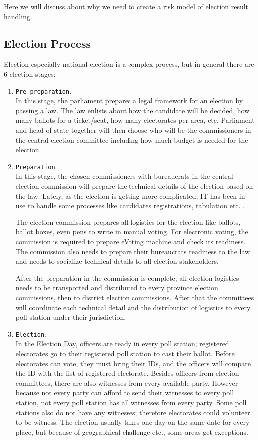 \documentclass[JIP]{ipsj}
\def\|{\verb|}
\begin{document}
Here we will discuss about why we need to create a risk model of election result handling.

\subsection{Election Process}%2.1
\label{ElectionProcess}

Election especially national election is a complex process, but in general there are 6 election stages:

\begin{enumerate}%{
\item \|Pre-preparation|.\\
In this stage, the parliament prepares a legal framework for an election by passing a law. The law enlists about how the candidate will be decided, how many ballots for a ticket/seat, how many electorates per area, etc. Parliament and head of state together will then choose who will be the commissioners in the central election committee including how much budget is needed for the election.

\item \|Preparation|.\\
In this stage, the chosen commissioners with bureaucrats in the central election commission will prepare the technical details of the election based on the law. Lately, as the election is getting more complicated, IT has been in use to handle some processes like candidates registrations, tabulation etc. \cite{Budi2008}.

The election commission prepares all logistics for the election like ballots, ballot boxes, even pens to write in manual voting. For electronic voting, the commission is required to prepare eVoting machine and check its readiness. The commission also needs to prepare their bureaucrats readiness to the law and needs to socialize technical details to all election stakeholders.

After the preparation in the commission is complete, all election logistics needs to be transported and distributed to every province election commissions, then to district election commissions. After that the committees will coordinate each technical detail and the distribution of logistics to every poll station under their jurisdiction.

\item \|Election|.\\
In the Election Day, officers are ready in every poll station; registered electorates go to their registered poll station to cast their ballot. Before electorates can vote, they must bring their IDs, and the officers will compare the ID with the list of registered electorate. Besides officers from election committees, there are also witnesses from every available party. However because not every party can afford to send their witnesses to every poll station, not every poll station has all witnesses from every party. Some poll stations also do not have any witnesses; therefore electorates could volunteer to be witness. The election usually takes one day on the same date for every place, but because of geographical challenge etc., some areas get exceptions.


\end{enumerate}
\end{document}
